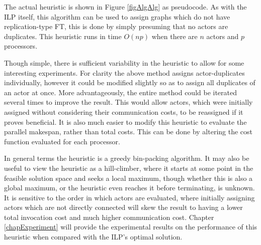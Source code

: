 The actual heuristic is shown in Figure \ref{figAlgAlg} as pseudocode.
As with the ILP itself, this algorithm can be used to assign graphs which do not have replication-type FT, this is done by simply presuming that no actors are duplicates.
This heuristic runs in time $O(np)$ when there are $n$ actors and $p$ processors.

Though simple, there is sufficient variability in the heuristic to allow for some interesting experiments.
For clarity the above method assigns actor-duplicates individually, however it could be modified slightly so as to assign all duplicates of an actor at once.
More advantageously, the entire method could be iterated several times to improve the result.
This would allow actors, which were initially assigned without considering their communication costs, to be reassigned if it proves beneficial.
It is also much easier to modify this heuristic to evaluate the parallel makespan, rather than total costs.
This can be done by altering the cost function evaluated for each processor.

In general terms the heuristic is a greedy bin-packing algorithm.
It may also be useful to view the heuristic as a hill-climber, where it starts at some point in the feasible solution space and seeks a local maximum, though whether this is also a global maximum, or the heuristic even reaches it before terminating, is unknown.
It is sensitive to the order in which actors are evaluated, where initially assigning actors which are not directly connected will skew the result to having a lower total invocation cost and much higher communication cost.
Chapter \ref{chapExperiment} will provide the experimental results on the performance of this heuristic when compared with the ILP's optimal solution.
